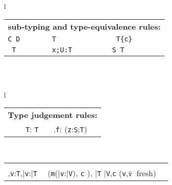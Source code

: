 \begin{figure*}
\begin{tabular}{l}
{\begin{tabular}{p{}p{}p{}}
\multicolumn{3}{l}{\bf \FX{} sub-typing and type-equivalence rules:}\\
\infrule[S-Extends]
{\tt class\ C(\ldots)\ extends\ D\{\ldots\}\in P}
{\tt\vdash C \subtype D}
&
\infrule[S-Const-L]
{\tt \Gamma,{\tt c} \vdash {\tt S}\; \subtype\; {\tt T}}
{\tt \Gamma \vdash {\tt S\{c\}}\;\subtype\; {\tt T}}
&
\infrule[S-Const-R]
{\tt \Gamma,{\tt \self:S} \vdash {\tt c}\andalso \Gamma \vdash {\tt S}\;\subtype\; {\tt T}}
{\tt \Gamma \vdash {\tt S}\;\subtype\; {\tt T\{c\}}}
\\
\infrule[S-Exists-L]
{\tt Gamma \vdash {\tt U}\ \type \andalso  \Gamma \vdash {\tt S}\; \subtype\; {\tt T}\andalso \mbox{({\tt x} fresh})}
{\tt \Gamma \vdash {\tt x:U;S}\;\subtype\; {\tt T}}
&
\infrule[S-Exists-R]
{\tt Gamma \vdash t:{\tt U} \andalso \Gamma \vdash {\tt S}\; \subtype\; {\tt T}[{\tt t}/{\tt x}]}
{\tt \Gamma \vdash {\tt S}\;\subtype\; {\tt x;U:T}}
&
\infrule[Type-equiv]
{\tt \Gamma \vdash S\; \subtype\; T \andalso \Gamma \vdash T\; \subtype\; S}
{\tt \Gamma \vdash S \equiv T} 
\end{tabular}
}\\
\quad\\
{\tabcolsep=0pt
\begin{tabular}{l}
\begin{tabular}{p{}p{}p{}}
\multicolumn{3}{l}{\bf Type judgement rules:}\\
\infax[T-Var]
{\Gamma, {\tt x}:{\tt T} \vdash {\tt x}:{\tt T\{\self{\tt ==x}\}}}
&
\infrule[T-Cast]
{\Gamma \vdash {\tt e}:{\tt U} \andalso \Gamma \vdash {\tt T} \ \type}
{\Gamma \vdash {\tt e}\ \as\ {\tt T}: {\tt T}} &
\infrule[T-Field]
{\Gamma \vdash {\tt e}: {\tt S} \andalso \Gamma,{\tt z}:{\tt S}\vdash {\tt z}\ \has\ {\tt f}:{\tt T} \andalso \mbox{({\tt z} fresh)} }
{\Gamma \vdash {\tt e}.{\tt f}:  ({\tt z}:{\tt S};{\tt T})}
\end{tabular}\\
\begin{tabular}{p{}p{}}
\infrule[T-INVK]
{\Gamma \vdash {\tt e}:{\tt T},\bar{\tt e}:\bar{\tt T} \andalso \\
\Gamma,{\tt v}:{\tt T},\bar{\tt v}:\bar{\tt T} \vdash {\tt v}\ \has\ ({\tt m}(\bar{\tt v}:\bar{\tt V}), {\tt c} \rightarrow {\tt U}), \bar{\tt T} \subtype \bar{\tt V},{\tt c} 
\andalso \mbox{({\tt v},$\bar{\tt v}$ fresh)}}
{\Gamma \vdash {\tt e}.{\tt m}(\bar{\tt e}): ({\tt v}:{\tt T};\bar{\tt v}:\bar{T};U)}

\end{tabular}
\end{tabular}}
\end{tabular}
\end{figure*}
